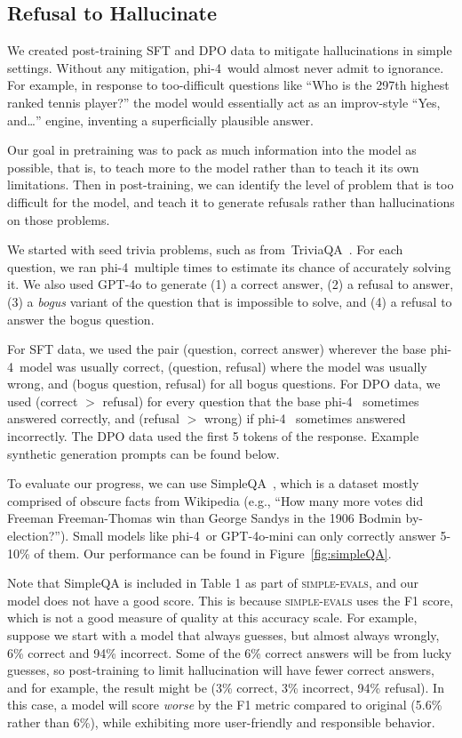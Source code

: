 \documentclass[11pt]{article}
\newcommand{\modelwithoutspace}{\textsf{phi-4}}
\newcommand{\model}{\modelwithoutspace~}
\begin{document}
\subsection{Refusal to Hallucinate}\label{sec:refusaltohallucinate}

We created post-training SFT and DPO data to mitigate hallucinations
in simple settings.  Without any mitigation, \model would almost
never admit to ignorance.  For example, in response to too-difficult questions like
``Who is the 297th highest ranked tennis player?'' the model would
essentially act as an improv-style ``Yes, and\dots'' engine, inventing a superficially
plausible answer.

Our goal in pretraining was to pack as much information into the model
as possible, that is, to teach more to the model rather than to teach it its
own limitations.  Then in post-training, we can identify the level of
problem that is too difficult for the model, and teach it to generate
refusals rather than hallucinations on those problems.

We started with seed trivia problems, such as from~TriviaQA~\cite{joshi2017triviaqa}.
For each question, we ran \model multiple times to estimate its
chance of accurately solving it.  We also used GPT-4o to generate (1)
a correct answer, (2) a refusal to answer, (3) a \emph{bogus} variant
of the question that is impossible to solve, and (4) a refusal to answer
the bogus question.

For SFT data, we used the pair (question, correct answer) wherever the base \model model was
usually correct, (question, refusal) where the model was usually wrong,
and (bogus question, refusal) for all bogus questions.  For DPO data,
we used (correct $>$ refusal) for every question that the base \model
sometimes answered correctly, and (refusal $>$ wrong) if \model 
sometimes answered incorrectly.  The DPO data used the first 5 tokens of the
response.  Example synthetic generation prompts can be found below.

To evaluate our progress, we can use SimpleQA~\cite{simpleqa}, which is a
dataset mostly comprised of obscure facts from Wikipedia (e.g.,
``How many more votes did Freeman Freeman-Thomas win than George
  Sandys in the 1906 Bodmin by-election?'').  Small models like \model or
GPT-4o-mini can only correctly answer 5-10\% of them.
Our performance can be found in Figure~\ref{fig:simpleQA}.


Note that SimpleQA is included in Table 1 as part of \textsc{simple-evals}, and
our model does not have a good score.  This is because \textsc{simple-evals}
uses the F1 score, which is not a good measure of quality at this
accuracy scale.  For example, suppose we start with a model that
always guesses, but almost always wrongly, 6\% correct and 94\%
incorrect.  Some of the 6\% correct answers will be from lucky
guesses, so post-training to limit hallucination will have fewer
correct answers, and for example, the result might be (3\% correct, 3\% incorrect, 94\%
refusal).  In this case, a model will score \emph{worse} by the F1 metric compared to
original (5.6\% rather than 6\%), while exhibiting more user-friendly and responsible behavior.
\end{document}
